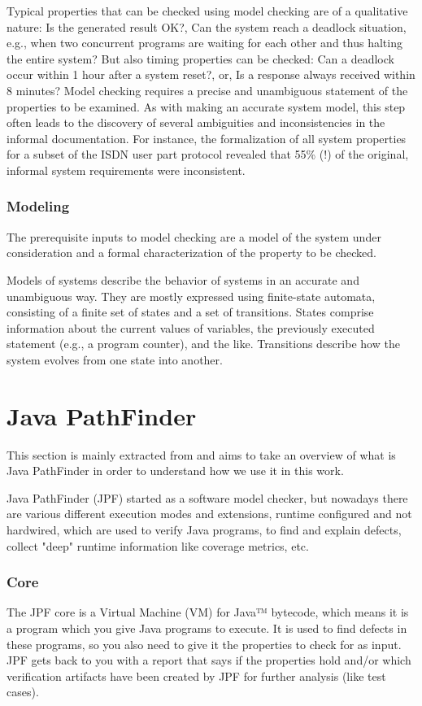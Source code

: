Typical properties that can be checked using model checking are of a qualitative nature: Is the generated result OK?, Can the system reach a deadlock situation, e.g., when two concurrent programs are waiting for each other and thus halting the entire system?  But also timing properties can be checked: Can a deadlock occur within 1 hour after a system reset?, or, Is a response always received within 8 minutes?  Model checking requires a precise and unambiguous statement of the properties to be examined.  As with making an accurate system model, this step often leads to the discovery of several ambiguities and inconsistencies in the informal documentation.  For instance, the formalization of all system properties for a subset of the ISDN user part protocol revealed that 55\% (!) of the original, informal system requirements were inconsistent.

\subsubsection{Modeling}
The prerequisite inputs to model checking are a model of the system under
consideration and a formal characterization of the property to be checked.

Models of systems describe the behavior of systems in an accurate  and unambiguous
way. They are mostly expressed using finite-state automata, consisting of a finite set
of states and a set of transitions. States comprise information about the current values of variables, the previously executed statement (e.g., a program counter), and the like. Transitions describe how the system evolves from one state into another.

\section{Java PathFinder}\label{sec:jpf}
This section is mainly extracted from \cite{jpf-site} and aims to take an overview of what is Java PathFinder in order to understand how we use it in this work.

Java PathFinder (JPF) started as a software model checker, but nowadays there are various different execution modes and extensions, runtime configured and not hardwired, which are used to verify Java programs, to find and explain defects, collect "deep" runtime information like coverage metrics, etc.

\subsubsection{Core}
The JPF core is a Virtual Machine (VM) for Java™ bytecode, which means it is a program which you give Java programs to execute. It is used to find defects in these programs, so you also need to give it the properties to check for as input. JPF gets back to you with a report that says if the properties hold and/or which verification artifacts have been created by JPF for further analysis (like test cases).

